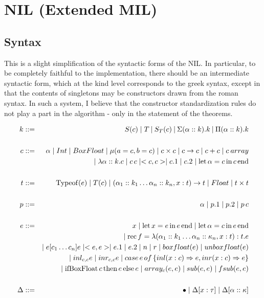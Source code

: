 \documentclass[12pt,twoside,fleqn]{amsart}
\theoremstyle{plain}
\theoremstyle{plain}
\theoremstyle{definition}
\begin{document}
\section{NIL (Extended MIL)}


\subsection{Syntax}

This is a slight simplification of the syntactic forms of the NIL. In particular,
to be completely faithful to the implementation, there should be an intermediate
syntactic form, which at the kind level corresponds to the greek syntax, except
in that the contents of singletons may be constructors drawn from the roman
syntax. In such a system, I believe that the constructor standardization rules
do not play a part in the algorithm - only in the statement of the theorems.


\newcommand{\typeof}[1]{\mathrm{Typeof}(#1 )}



\begin{eqnarray*}
k & ::= & S(c)\mid T\: |\: \st{c}\: |\: \Sigma (\alpha ::k).k\: |\: \Pi (\alpha ::k).k\\
 &  & \\
c & ::= & \alpha \mid Int\mid BoxFloat\mid \mu (a=c,b=c)\mid c\times c\mid c\rightarrow c\mid c+c\mid \carray{c}\\
 &  & \mid \Lam{\alpha }{k}{c}\mid c\, c\mid <c,c>\mid c.1\mid c.2\mid \Let{\alpha }{c}{c}\\
 &  & \\
t & ::= & \typeof{e}\mid T(c)\mid (\alpha _{1}::k_{1}\ldots \alpha _{n}::k_{n},x:t)\rightarrow t\mid Float\mid t\times t\\
 &  & \\
p & ::= & \alpha \mid p.1\mid p.2\mid p\, c\\
 &  & \\
e & ::= & x\mid \lete{x}{e}{e}\mid \lete{\alpha }{c}{e}\\
 &  & \mid \rec{f}{\alpha _{1}}{k_{1}\ldots \alpha _{n}::\kappa _{n}}{x}{t}{t}{e}\\
 &  & \mid e[c_{1}\ldots c_{n}]e\mid <e,e>\mid e.1\mid e.2\mid n\mid r\mid \boxf{e}\mid \unboxf{e}\\
 &  & \mid \inl{c}{c}{e}\mid \inr{c}{c}{e}\mid \sumsw{e}{x}{c}{e}{x}{c}{e}\\
 &  & \mid \iffloat{c}{e}{e}\mid \arr{c}{e}{e}\mid \sub{e}{e}\mid \fsub{e}{e}\\
 &  & \\
\Delta  & ::= & \bullet \mid \caddt{x}{\tau }\mid \caddk{\alpha }{\kappa }
\end{eqnarray*}
\end{document}
